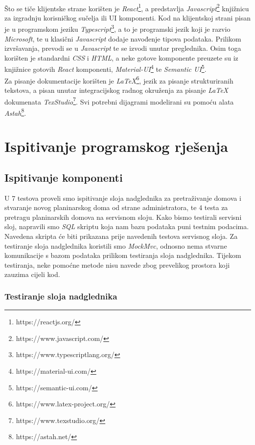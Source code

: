 			  \\Što se tiče klijentske strane korišten je \textit{React}\footnote{https://reactjs.org/}, a predstavlja \textit{Javascript}\footnote{https://www.javascript.com/} knjižnicu za izgradnju korisničkog sučelja ili UI komponenti. Kod na klijentskoj strani pisan je u programskom jeziku \textit{Typescript}\footnote{https://www.typescriptlang.org/}, a to je programski jezik koji je razvio \textit{Microsoft}, te u klasični \textit{Javascript} dodaje navođenje tipova podataka. Prilikom izvršavanja, prevodi se u \textit{Javascript} te se izvodi unutar preglednika. Osim toga korišten je standardni \textit{CSS} i \textit{HTML}, a neke gotove komponente preuzete su iz knjižnice gotovih \textit{React} komponenti, \textit{Material-UI}\footnote{https://material-ui.com/} te \textit{Semantic UI}\footnote{https://semantic-ui.com/}.\\
			  Za pisanje dokumentacije korišten je \textit{LaTeX}\footnote{https://www.latex-project.org/}, jezik za pisanje strukturiranih tekstova, a pisan unutar integracijskog radnog okruženja za pisanje \textit{LaTeX} dokumenata \textit{TexStudio}\footnote{https://www.texstudio.org/}. Svi potrebni dijagrami modelirani su pomoću alata \textit{Astah}\footnote{https://astah.net/}.
			 		
			\eject 
		
	
		\section{Ispitivanje programskog rješenja}
			
			\subsection{Ispitivanje komponenti}
			U 7 testova proveli smo ispitivanje sloja nadglednika za pretraživanje domova i stvaranje novog planinarskog doma od strane administratora, te 4 testa za pretragu planinarskih domova na servisnom sloju. Kako bismo testirali servisni sloj, napravili smo \textit{SQL} skriptu koja nam bazu podataka puni testnim podacima. Navedena skripta će biti prikazana prije navedenih testova servisnog sloja.
			Za testiranje sloja nadglednika koristili smo \textit{MockMvc}, odnosno nema stvarne komunikacije s bazom podataka prilikom testiranja sloja nadglednika. Tijekom testiranja, neke pomoćne metode nisu navede zbog prevelikog prostora koji zauzima cijeli kod.\\
			
			\subsubsection{Testiranje sloja nadglednika}
			
